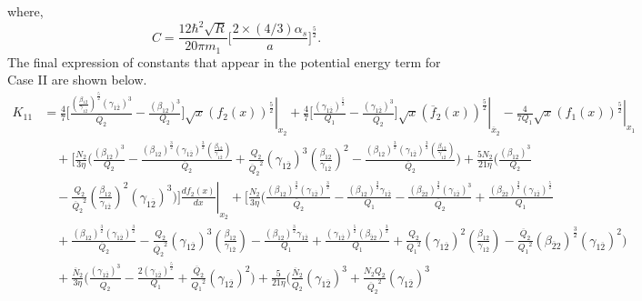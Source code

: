 \documentclass[fleqn]{article}
\begin{document}
        where,
        \begin{equation}
            C = \frac{12\hbar^2\sqrt{R}}{20 \pi m_1}\biggl[\frac{2\times(4/3)\alpha_s}{a}\biggr]^\frac{5}{2}.
            \label{eqn:expression_of_C}
        \end{equation} 
             The final expression of constants that appear in the potential energy term for Case II are shown below.    
            \begin{equation}
                \begin{split}
                    K_{11} & = \frac{4}{7} \biggl[ \frac{\left( \frac{\beta_{12}}{\gamma_{1\overline{2}}}\right)^\frac{5}{2} (\gamma_{1\overline{2}})^3}{\overline{Q}_{2}} - \left. \frac{(\beta_{12})^3}{Q_2} \biggr] \sqrt{x} (f_2(x))^\frac{5}{2} \right|_{x_2} + \left. \frac{4}{7} \biggl[\frac{(\gamma_{1\overline{2}})^\frac{5}{2}}{Q_1} - \frac{(\gamma_{1\overline{2}})^3}{\overline{Q}_{2}} \biggr] \sqrt{x} (\overline{f}_{2}(x))^\frac{5}{2} \right|_{\overline{x}_{2}} -\left. \frac{4}{7 Q_1} \sqrt{x} (f_1(x))^\frac{5}{2} \right|_{x_1} \\ & \quad + \Biggl[ \frac{N_2}{3 \eta} \Biggl( \frac{(\beta_{12})^3}{Q_2}  - \frac{(\beta_{12})^\frac{3}{2} (\gamma_{1\overline{2}})^\frac{3}{2} \left( \frac{\beta_{12}}{\gamma_{1\overline{2}}}\right)}{\overline{Q}_{2}} + \frac{Q_2}{{\overline{Q}_{2}}^2} (\gamma_{1\overline{2}})^3 \left( \frac{\beta_{12}}{\gamma_{1\overline{2}}}\right)^2 - \frac{(\beta_{12})^\frac{3}{2} (\gamma_{1\overline{2}})^\frac{3}{2} \left( \frac{\beta_{12}}{\gamma_{1\overline{2}}}\right)}{\overline{Q}_{2}} \Biggr) + \frac{5 N_2}{21 \eta} \Biggl( \frac{(\beta_{12})^3}{Q_2} \\ & \quad - \left. \frac{Q_2}{{\overline{Q}_{2}}^2} \left( \frac{\beta_{12}}{\gamma_{1\overline{2}}}\right)^2 (\gamma_{1\overline{2}})^3 \Biggr) \Biggr] \frac{df_2(x)}{dx} \right|_{x_2}  + \Biggl[ \frac{N_2}{3 \eta} \Biggl( \frac{(\beta_{12})^\frac{3}{2} (\gamma_{1\overline{2}})^\frac{3}{2}}{\overline{Q}_{2}} - \frac{(\beta_{12})^\frac{3}{2} \gamma_{1\overline{2}}}{Q_1} - \frac{(\beta_{\overline{2}2})^\frac{3}{2}(\gamma_{1\overline{2}})^3}{\overline{Q}_{2}} + \frac{(\beta_{\overline{2}2})^\frac{3}{2} (\gamma_{1\overline{2}})^\frac{5}{2}}{Q_1} \\ & \quad + \frac{(\beta_{12})^\frac{3}{2} (\gamma_{1\overline{2}})^\frac{3}{2}}{\overline{Q}_{2}} - \frac{Q_2}{{\overline{Q}_{2}}^2} (\gamma_{1\overline{2}})^3 \left( \frac{\beta_{12}}{\gamma_{1\overline{2}}}\right) - \frac{(\beta_{12})^\frac{3}{2} \gamma_{1\overline{2}}}{Q_1}  + \frac{(\gamma_{1\overline{2}})^\frac{5}{2} (\beta_{\overline{2}2})^\frac{3}{2}}{Q_1} + \frac{Q_2}{{Q_1}^2} (\gamma_{1\overline{2}})^2 \left( \frac{\beta_{12}}{\gamma_{1\overline{2}}}\right) - \frac{\overline{Q}_{2}}{{Q_1}^2} (\beta_{\overline{2}2})^\frac{3}{2} (\gamma_{1\overline{2}})^2 \Biggr) \\ & \quad + \frac{\overline{N}_{2}}{3 \eta} \Biggl( \frac{(\gamma_{1\overline{2}})^3}{\overline{Q}_{2}} - \frac{2(\gamma_{1\overline{2}})^\frac{5}{2}}{Q_1} + \frac{\overline{Q}_{2}}{{Q_1}^2} (\gamma_{1\overline{2}})^2 \Biggr)  + \frac{5}{21 \eta} \Biggl( \frac{\overline{N}_{2}}{\overline{Q}_{2}} (\gamma_{1\overline{2}})^3 + \frac{N_2 Q_2}{{\overline{Q}_{2}}^2}(\gamma_{1\overline{2}})^3 
\end{split}
\end{equation}
\end{document}

